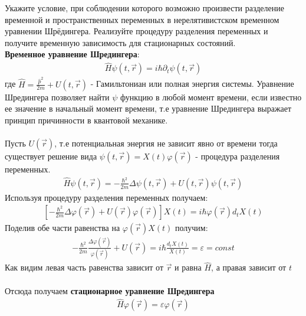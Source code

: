 \documentclass[__main__.tex]{subfiles}
\begin{document}
Укажите условие, при соблюдении которого возможно произвести разделение временной и пространственных переменных в нерелятивистском временном уравнении Шрёдингера. Реализуйте процедуру разделения переменных и получите временную зависимость для стационарных состояний.\\

\textbf{Временное уравнение Шредингера}:
\begin{gather*}
    \hat{H}\psi(t,\vec{r}) = i\hbar \partial_{t}\psi(t,\vec{r})
\end{gather*}
где $\hat{H} = \frac{\hat{p}^2}{2m}+U(t,\vec{r})$ - Гамильтониан или полная энергия системы.
Уравнение Шредингера позволяет найти $\psi$ функцию в любой момент времени, если известно ее значение в начальный момент времени, т.е уравнение Шредингера выражает принцип причинности в квантовой механике.\\\\
Пусть $U(\vec{r})$, т.е потенциальная энергия не зависит явно от времени тогда существует решение вида $\psi(t,\vec{r})=X(t)\varphi(\vec{r})$ - процедура разделения переменных.
\begin{gather*}
    \hat{H}\psi(t,\vec{r})=-\frac{\hbar^2}{2m}\Delta\psi(t,\vec{r})+U(t,\vec{r})\psi(t,\vec{r})
\end{gather*}
Используя процедуру разделения переменных получаем:
\begin{gather*}
    \left[
        -\frac{\hbar^2}{2m}\Delta\varphi(\vec{r})+U(\vec{r})\varphi(\vec{r})
        \right]X(t)
    =
    i\hbar \varphi(\vec{r}) d_{t}X(t)
\end{gather*}
Поделив обе части равенства на $\varphi(\vec{r})X(t)$ получим:
\begin{gather*}
    -\frac{\hbar^2}{2m}\frac{\Delta\varphi(\vec{r})}{\varphi(\vec{r})}+U(\vec{r})
    =
    i\hbar\frac{d_{t}X(t)}{X(t)}
    =
    \varepsilon=const
\end{gather*}
Как видим левая часть равенства зависит от $\vec{r}$ и равна $\hat{H}$, а правая зависит от $t$\\\\
Отсюда получаем \textbf{стационарное уравнение Шредингера}
\begin{gather*}
    \hat{H}\varphi(\vec{r}) = \varepsilon\varphi(\vec{r})
\end{gather*}
\end{document}

